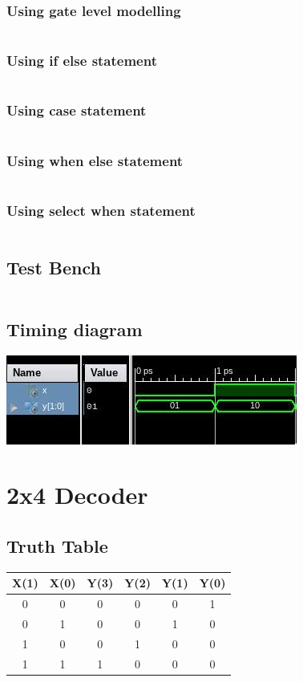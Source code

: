 \documentclass[titlepage]{article}
\begin{document}
    \subsubsection{Using gate level modelling}
        \inputminted{vhdl}{./codes/a3_1a.vhd}
    \subsubsection{Using if else statement} 
        \inputminted{vhdl}{./codes/a3_1ba.vhd}
    \subsubsection{Using case statement}
        \inputminted{vhdl}{./codes/a3_1bb.vhd}
    \subsubsection{Using when else statement}
        \inputminted{vhdl}{./codes/a3_1bc.vhd}
    \subsubsection{Using select when statement}
        \inputminted{vhdl}{./codes/a3_1bd.vhd}
    \subsection{Test Bench}
    \inputminted{vhdl}{./codes/tb_a3_1a.vhd}
    \subsection{Timing diagram}
    \includegraphics{./figures/td_1x2.jpeg}





    \section{2x4 Decoder}
    \subsection{Truth Table}
    \begin{tabular}{| c | c | c | c | c | c |}
        \hline
        X(1) & X(0) & Y(3) & Y(2) & Y(1) & Y(0) \\
        \hline
        0 & 0 & 0 & 0 & 0 & 1 \\
        0 & 1 & 0 & 0 & 1 & 0 \\
        1 & 0 & 0 & 1 & 0 & 0 \\
        1 & 1 & 1 & 0 & 0 & 0 \\
        \hline
    \end{tabular}
\end{document}
